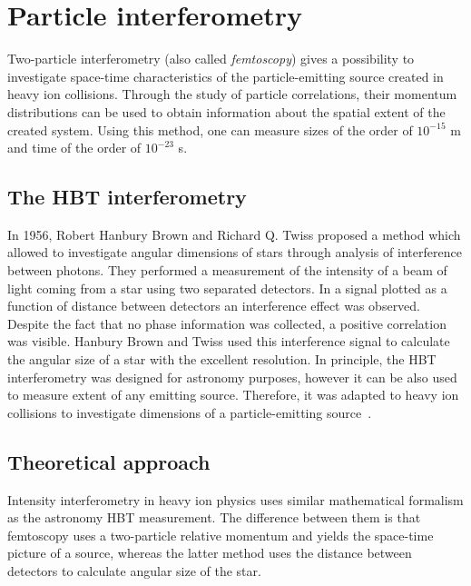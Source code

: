 %
\chapter{Particle interferometry}
\label{ch:pi}
  Two-particle interferometry (also called \textit{femtoscopy}) gives a possibility to investigate space-time characteristics of the particle-emitting source created in heavy ion collisions.
  Through the study of particle correlations, their momentum distributions can be used to obtain information about the spatial extent of the created system.
  Using this method, one can measure sizes of the order of $10^{-15}$ m and time of the order of $10^{-23}$ s.
  \section{The HBT interferometry}
    In 1956, Robert Hanbury Brown and Richard Q. Twiss proposed a method which allowed to investigate angular dimensions of stars through analysis of interference between photons.
    They performed a measurement of the intensity of a beam of light coming from a star using two separated detectors.
    In a signal plotted as a function of distance between detectors an interference effect was observed. Despite the fact that no phase information was collected, a positive correlation was visible.
    Hanbury Brown and Twiss used this interference signal to calculate the angular size of a star with the excellent resolution.
    In principle, the HBT interferometry was designed for astronomy purposes, however it can be also used to measure extent of any emitting source.
    Therefore, it was adapted to heavy ion collisions to investigate dimensions of a particle-emitting source~\cite{drkisiel}.
  \section{Theoretical approach}
    Intensity interferometry in heavy ion physics uses similar mathematical formalism as the astronomy HBT measurement.
    The difference between them is that femtoscopy uses a two-particle relative momentum and yields the space-time picture of a source, whereas the latter method uses the distance between detectors to calculate angular size of the star.
